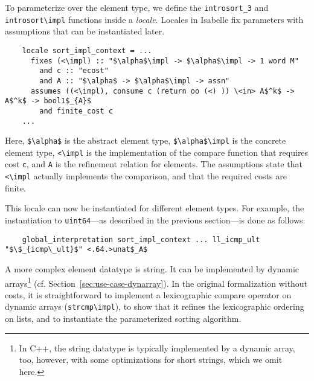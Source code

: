 \documentclass[acmsmall]{acmart}
\newcommand{\is}{\lstinline[language=isabelle]}
\begin{document}
  To parameterize over the element type, we define the
  \is{introsort_3} and \is{introsort\impl} functions inside a \emph{locale}.
  Locales in Isabelle fix parameters with assumptions that can be instantiated later.

\begin{lstlisting}
    locale sort_impl_context = ...
      fixes (<\impl) :: "$\alpha$\impl -> $\alpha$\impl -> 1 word M"
        and c :: "ecost"
        and A :: "$\alpha$ -> $\alpha$\impl -> assn"
      assumes ((<\impl), consume c (return oo (<) )) \<in> A$^k$ -> A$^k$ -> bool1$_{A}$
        and finite_cost c
    ...
\end{lstlisting}
  Here, \is{$\alpha$} is the abstract element type, \is{$\alpha$\impl} is the concrete element type, \is{<\impl} is the implementation of the compare function that requires cost \is{c}, and \is{A} is the refinement relation for elements.
  The assumptions state that \is{<\impl} actually implements the comparison, and that the required costs are finite.
  

  This locale can now be instantiated for different element types. For example, the instantiation to \is{uint64}---as described in the previous section---is done as follows:
\begin{lstlisting}
    global_interpretation sort_impl_context ... ll_icmp_ult  "$\$_{icmp\_ult}$" <.64.>unat$_A$
\end{lstlisting}

  A more complex element datatype is string. 
  It can be implemented by dynamic arrays\footnote{In C++, the string datatype is typically implemented by a dynamic array, too, however, with some optimizations for short strings, which we omit here.} (cf. Section~\ref{sec:use-case-dynarray}).
% 
  In the original formalization without costs, it is straightforward to implement a lexicographic compare operator on dynamic arrays (\is{strcmp\impl}), to show that it refines the lexicographic ordering on lists,
  and to instantiate the parameterized sorting algorithm. 
  
\end{document}
